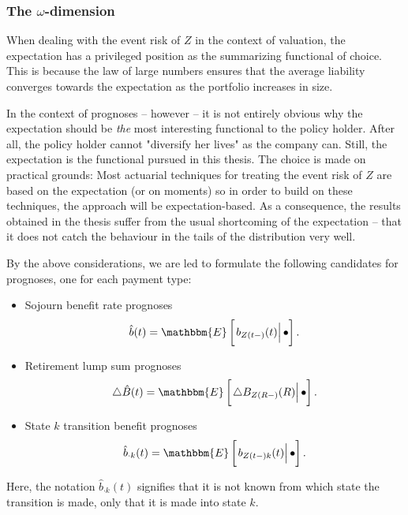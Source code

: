 \documentclass{article}
\newcommand{\1}[1]{\mathbbm{1}_{\left\lbrace #1 \right\rbrace}}
\newcommand{\econd}[2][def]{\mathbbm{E} \left[ \left. #1 \right| #2 \right]}
\theoremstyle{break}
\theoremstyle{remark}
\numberwithin{equation}{section}
\begin{document}
\subsubsection{The $\omega$-dimension}

When dealing with the event risk of $Z$ in the context of valuation, the expectation has a privileged position as the summarizing functional of choice. This is because the law of large numbers ensures that the average liability converges towards the expectation as the portfolio increases in size.

In the context of prognoses -- however -- it is not entirely obvious why the expectation should be \textit{the} most interesting functional to the policy holder. After all, the policy holder cannot "diversify her lives" as the company can. Still, the expectation is the functional pursued in this thesis. The choice is made on practical grounds: Most actuarial techniques for treating the event risk of $Z$ are based on the expectation (or on moments) so in order to build on these techniques, the approach will be expectation-based. As a consequence, the results obtained in the thesis suffer from the usual shortcoming of the expectation -- that it does not catch the behaviour in the tails of the distribution very well.

By the above considerations, we are led to formulate the following candidates for prognoses, one for each payment type:

\begin{itemize}
    \item Sojourn benefit rate prognoses
    \begin{align*}
        \hat{b}(t) = \econd[b_{Z(t-)}(t)]{\bullet}.
    \end{align*}
    \item Retirement lump sum prognoses
    \begin{align*}
        \triangle \hat{B}(t) = \econd[\triangle B_{Z(R-)}(R)]{\bullet}.
    \end{align*}
    \item State $k$ transition benefit prognoses
    \begin{align*}
        \hat{b}_{\cdot k}(t) = \econd[b_{Z(t-)k}(t)]{\bullet}.
    \end{align*}
\end{itemize}

Here, the notation $\hat{b}_{\cdot k}(t)$ signifies that it is not known from which state the transition is made, only that it is made into state $k$.
\end{document}
